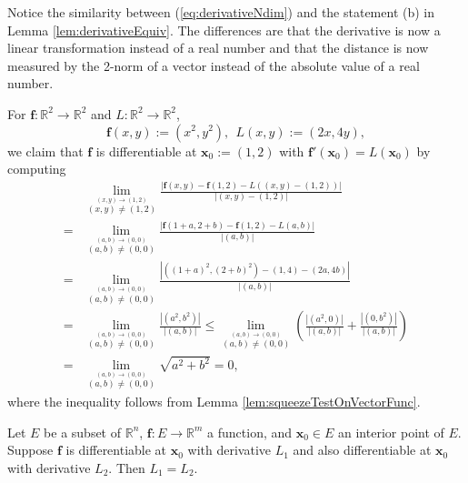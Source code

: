 \begin{rem}
  Notice the similarity between (\ref{eq:derivativeNdim})
  and the statement (b) in Lemma \ref{lem:derivativeEquiv}.
  The differences are that the derivative is now a linear
  transformation instead of a real number
  and that the distance is now measured by the 2-norm of a vector
  instead of the absolute value of a real number.  
\end{rem}

\begin{exm}
  For $\mathbf{f}: \mathbb{R}^2\rightarrow \mathbb{R}^2$
  and $L: \mathbb{R}^2\rightarrow \mathbb{R}^2$,
  \begin{equation}
    \label{eq:fSqaureComp}
    \mathbf{f}(x,y):=(x^2, y^2), \ \ L(x,y):=(2x, 4y), 
  \end{equation}
  we claim that $\mathbf{f}$ is differentiable at $\mathbf{x}_{0}:=(1,2)$
  with \mbox{$\mathbf{f}'(\mathbf{x}_0)=L(\mathbf{x}_{0})$} by computing
  \begin{displaymath}
    \renewcommand{\arraystretch}{1.5}
    \begin{array}{rl}
    &\lim_{\stackrel{(x,y)\rightarrow (1,2)}{(x,y)\ne(1,2)}}
      \frac{|\mathbf{f}(x,y)- \mathbf{f}(1,2)
      - L((x,y)-(1,2))|}{|(x,y)-(1,2)|}
      \\
    =&\lim_{\stackrel{(a,b)\rightarrow (0,0)}{(a,b)\ne(0,0)}}
    \frac{|\mathbf{f}(1+a,2+b)- \mathbf{f}(1,2) - L(a,b)|}{|(a,b)|}
      \\
    =&\lim_{\stackrel{(a,b)\rightarrow (0,0)}{(a,b)\ne(0,0)}}
    \frac{|\left((1+a)^2,(2+b)^2\right)- (1,4) - (2a,4b)|}{|(a,b)|}
      \\
    =&\lim_{\stackrel{(a,b)\rightarrow (0,0)}{(a,b)\ne(0,0)}}
    \frac{|(a^2, b^2)|}{|(a,b)|}
    \le \lim_{\stackrel{(a,b)\rightarrow (0,0)}{(a,b)\ne(0,0)}}
          \left(\frac{|(a^2, 0)|}{|(a,b)|}
          +  \frac{|(0, b^2)|}{|(a,b)|}\right)
      \\
    = &\lim_{\stackrel{(a,b)\rightarrow (0,0)}{(a,b)\ne(0,0)}}
        \sqrt{a^2 + b^2}
    = 0,
    \end{array}
  \end{displaymath}
  where the inequality follows from
  Lemma \ref{lem:squeezeTestOnVectorFunc}. 
\end{exm}

\begin{lem}
  \label{lem:uniquenessOfDerivatives}
  Let $E$ be a subset of $\mathbb{R}^n$,
  $\mathbf{f}: E\rightarrow \mathbb{R}^m$ a function,
  and $\mathbf{x}_0\in E$ an interior point of $E$.
  Suppose $\mathbf{f}$ is differentiable at $\mathbf{x}_0$
  with derivative $L_1$
  and also differentiable at $\mathbf{x}_0$ with derivative $L_2$.
  Then $L_1=L_2$.
\end{lem}


